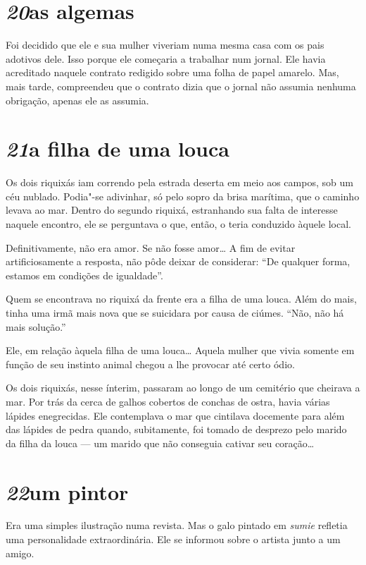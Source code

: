 \section*{\textit{20}\es as algemas}

Foi decidido que ele e sua mulher viveriam numa mesma casa com os pais
adotivos dele. Isso porque ele começaria a trabalhar num jornal. Ele
havia acreditado naquele contrato redigido sobre uma folha de papel
amarelo. Mas, mais tarde, compreendeu que o contrato dizia que o jornal
não assumia nenhuma obrigação, apenas ele as assumia.

\section*{\textit{21}\es a filha de uma louca}

Os dois riquixás iam correndo pela estrada deserta em meio aos campos,
sob um céu nublado. Podia"-se adivinhar, só pelo sopro da brisa
marítima, que o caminho levava ao mar. Dentro do segundo riquixá,
estranhando sua falta de interesse naquele encontro, ele se perguntava
o que, então, o teria conduzido àquele local.

Definitivamente, não era amor. Se não fosse amor\ldots{} A fim de evitar
artificiosamente a resposta, não pôde deixar de considerar: ``De
qualquer forma, estamos em condições de igualdade''.

Quem se encontrava no riquixá da frente era a filha de uma louca. Além
do mais, tinha uma irmã mais nova que se suicidara por causa de ciúmes.
``Não, não há mais solução.''

Ele, em relação àquela filha de uma louca\ldots{} Aquela mulher que vivia
somente em função de seu instinto animal chegou a lhe provocar até
certo ódio.

Os dois riquixás, nesse ínterim, passaram ao longo de um cemitério que
cheirava a mar. Por trás da cerca de galhos cobertos de conchas de
ostra, havia várias lápides enegrecidas. Ele contemplava o mar que
cintilava docemente para além das lápides de pedra quando, subitamente,
foi tomado de desprezo pelo marido da filha da louca --- um marido que
não conseguia cativar seu coração\ldots{}

\section*{\textit{22}\es um pintor}

Era uma simples ilustração numa revista. Mas o galo pintado em
\textit{sumie} refletia uma personalidade extraordinária. Ele se
informou sobre o artista junto a um amigo.

